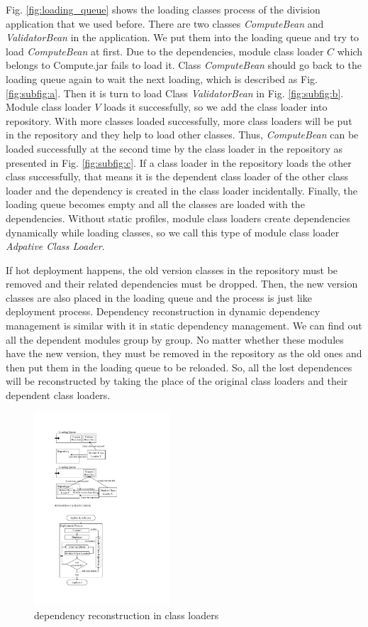 \documentclass[conference]{IEEEtran}
\begin{document}
Fig. \ref{fig:loading_queue} shows the loading classes process of the division application that we used before. 
There are two classes \emph{ComputeBean} and \emph{ValidatorBean} in the application. 
We put them into the loading queue and try to load \emph{ComputeBean} at first. 
Due to the dependencies, module class loader $C$ which belongs to Compute.jar fails to load it. 
Class \emph{ComputeBean} should go back to the loading queue again to wait the next loading, which is described as Fig. \ref{fig:subfig:a}. 
Then it is turn to load Class \emph{ValidatorBean} in Fig. \ref{fig:subfig:b}. 
Module class loader $V$ loads it successfully, so we add the class loader into repository. 
With more classes loaded successfully, more class loaders will be put in the repository and they help to load other classes. 
Thus, \emph{ComputeBean} can be loaded successfully at the second time by the class loader in the repository as presented in Fig. \ref{fig:subfig:c}.
If a class loader in the repository loads the other class successfully, that means it is the dependent class loader of the other class loader and the dependency is created in the class loader incidentally. 
Finally, the loading queue becomes empty and all the classes are loaded with the dependencies.
Without static profiles, module class loaders create dependencies dynamically while loading classes, so we call this type of module class loader \emph{Adpative Class Loader}.

If hot deployment happens, the old version classes in the repository must be removed and their related dependencies must be dropped. 
Then, the new version classes are also placed in the loading queue and the process is just like deployment process. 
Dependency reconstruction in dynamic dependency management is similar with it in static dependency management. 
We can find out all the dependent modules group by group. 
No matter whether these modules have the new version, they must be removed in the repository as the old ones and then put them in the loading queue to be reloaded. 
So, all the lost dependences will be reconstructed by taking the place of the original class loaders and their dependent class loaders. 

\begin{figure}[ht]
\centering
\includegraphics[width=2.0in]{ProcessReconstructionCL.pdf}
\caption{dependency reconstruction in class loaders}
\label{fig:reconstruction_CL}
\end{figure}
\end{document}
